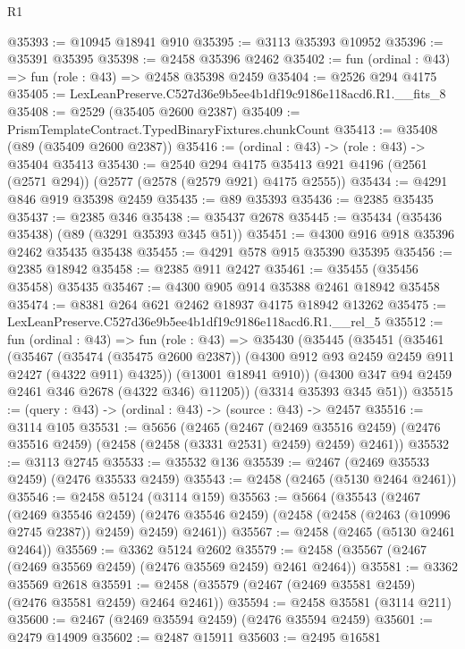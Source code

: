 \begin{lexlean}{R1}
\begin{coremodule}
@35393 := @10945 @18941 @910
@35395 := @3113 @35393 @10952
@35396 := @35391 @35395
@35398 := @2458 @35396 @2462
@35402 := fun (ordinal : @43) => fun (role : @43) => @2458 @35398 @2459
@35404 := @2526 @294 @4175
@35405 := LexLeanPreserve.C527d36e9b5ee4b1df19c9186e118acd6.R1.__fits_8
@35408 := @2529 (@35405 @2600 @2387)
@35409 := PrismTemplateContract.TypedBinaryFixtures.chunkCount
@35413 := @35408 (@89 (@35409 @2600 @2387))
@35416 := (ordinal : @43) -> (role : @43) -> @35404 @35413
@35430 := @2540
    @294
    @4175
    @35413
    @921
    @4196
    (@2561 (@2571 @294))
    (@2577 (@2578 (@2579 @921) @4175 @2555))
@35434 := @4291 @846 @919 @35398 @2459
@35435 := @89 @35393
@35436 := @2385 @35435
@35437 := @2385 @346
@35438 := @35437 @2678
@35445 := @35434 (@35436 @35438) (@89 (@3291 @35393 @345 @51))
@35451 := @4300 @916 @918 @35396 @2462 @35435 @35438
@35455 := @4291 @578 @915 @35390 @35395
@35456 := @2385 @18942
@35458 := @2385 @911 @2427
@35461 := @35455 (@35456 @35458) @35435
@35467 := @4300 @905 @914 @35388 @2461 @18942 @35458
@35474 := @8381 @264 @621 @2462 @18937 @4175 @18942 @13262
@35475 := LexLeanPreserve.C527d36e9b5ee4b1df19c9186e118acd6.R1.__rel_5
@35512 := fun (ordinal : @43) =>
  fun (role : @43) =>
  @35430
    (@35445
      (@35451
        (@35461
          (@35467
            (@35474 (@35475 @2600 @2387))
            (@4300 @912 @93 @2459 @2459 @911 @2427 (@4322 @911) @4325))
          (@13001 @18941 @910))
        (@4300 @347 @94 @2459 @2461 @346 @2678 (@4322 @346) @11205))
      (@3314 @35393 @345 @51))
@35515 := (query : @43) -> (ordinal : @43) -> (source : @43) -> @2457
@35516 := @3114 @105
@35531 := @5656
    (@2465
      (@2467
        (@2469 @35516 @2459)
        (@2476 @35516 @2459)
        (@2458 (@2458 (@3331 @2531) @2459) @2459)
        @2461))
@35532 := @3113 @2745
@35533 := @35532 @136
@35539 := @2467 (@2469 @35533 @2459) (@2476 @35533 @2459)
@35543 := @2458 (@2465 (@5130 @2464 @2461))
@35546 := @2458 @5124 (@3114 @159)
@35563 := @5664
    (@35543
      (@2467
        (@2469 @35546 @2459)
        (@2476 @35546 @2459)
        (@2458 (@2458 (@2463 (@10996 @2745 @2387)) @2459) @2459)
        @2461))
@35567 := @2458 (@2465 (@5130 @2461 @2464))
@35569 := @3362 @5124 @2602
@35579 := @2458 (@35567 (@2467 (@2469 @35569 @2459) (@2476 @35569 @2459) @2461 @2464))
@35581 := @3362 @35569 @2618
@35591 := @2458 (@35579 (@2467 (@2469 @35581 @2459) (@2476 @35581 @2459) @2464 @2461))
@35594 := @2458 @35581 (@3114 @211)
@35600 := @2467 (@2469 @35594 @2459) (@2476 @35594 @2459)
@35601 := @2479 @14909
@35602 := @2487 @15911
@35603 := @2495 @16581

\end{coremodule}
\end{lexlean}
